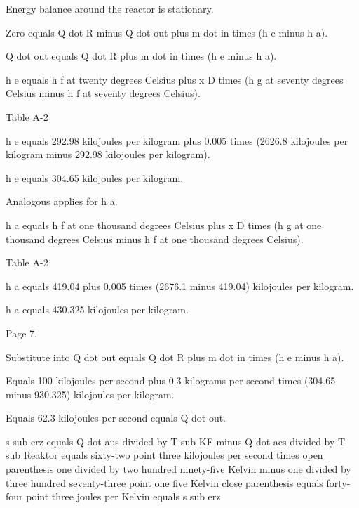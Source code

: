 Energy balance around the reactor is stationary.

Zero equals Q dot R minus Q dot out plus m dot in times (h e minus h a).

Q dot out equals Q dot R plus m dot in times (h e minus h a).

h e equals h f at twenty degrees Celsius plus x D times (h g at seventy degrees Celsius minus h f at seventy degrees Celsius).

Table A-2

h e equals 292.98 kilojoules per kilogram plus 0.005 times (2626.8 kilojoules per kilogram minus 292.98 kilojoules per kilogram).

h e equals 304.65 kilojoules per kilogram.

Analogous applies for h a.

h a equals h f at one thousand degrees Celsius plus x D times (h g at one thousand degrees Celsius minus h f at one thousand degrees Celsius).

Table A-2

h a equals 419.04 plus 0.005 times (2676.1 minus 419.04) kilojoules per kilogram.

h a equals 430.325 kilojoules per kilogram.

Page 7.

Substitute into Q dot out equals Q dot R plus m dot in times (h e minus h a).

Equals 100 kilojoules per second plus 0.3 kilograms per second times (304.65 minus 930.325) kilojoules per kilogram.

Equals 62.3 kilojoules per second equals Q dot out.

s sub erz equals Q dot aus divided by T sub KF minus Q dot acs divided by T sub Reaktor equals sixty-two point three kilojoules per second times open parenthesis one divided by two hundred ninety-five Kelvin minus one divided by three hundred seventy-three point one five Kelvin close parenthesis equals forty-four point three joules per Kelvin equals s sub erz